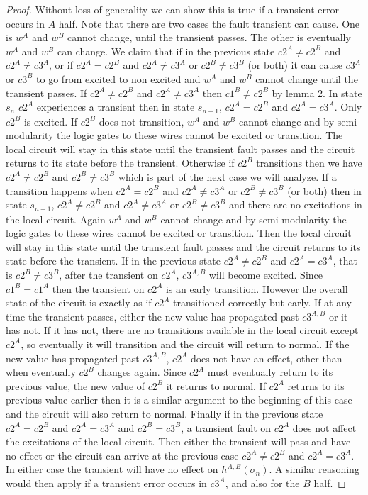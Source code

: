 \documentclass{article}
\begin{document}
\begin{proof}
Without loss of generality we can show this is true if a transient error occurs in $A$ half.  %
Note that there are two cases the fault transient can cause.  One is $w^A$ and $w^B$ cannot change, until the transient passes.  The other is eventually $w^A$ and $w^B$ can change. \newline
We claim that if in the previous state $c2^A \neq c2^B$ and $c2^A \neq c3^A$, or if $c2^A=c2^B$ and $c2^A\neq c3^A$ or $c2^B\neq c3^B$ (or both) it can cause $c3^A$ or $c3^B$ to go from excited to non excited and $w^A$ and $w^B$ cannot change until the transient passes.  If $c2^A \neq c2^B$ and $c2^A \neq c3^A$ then $c1^B\neq c2^B$ by lemma 2. In state $s_n$ $c2^A$ experiences a transient then in state $s_{n+1}$, $c2^A=c2^B$ and $c2^A=c3^A$.  Only $c2^B$ is excited.  If $c2^B$ does not transition, $w^A$ and $w^B$ cannot change and by semi-modularity the logic gates to these wires cannot be excited or transition. The local circuit will stay in this state until the transient fault passes and the circuit returns to its state before the transient.  Otherwise if $c2^B$ transitions then we have $c2^A\neq c2^B$ and $c2^B \neq c3^B$ which is part of the next case we will analyze.
If a transition happens when $c2^A=c2^B$ and $c2^A\neq c3^A$ or $c2^B\neq c3^B$ (or both) then in state $s_{n+1}$, $c2^A\neq c2^B$ and $c2^A\neq c3^A$ or $c2^B\neq c3^B$ and there are no excitations in the local circuit.  Again $w^A$ and $w^B$ cannot change and by semi-modularity the logic gates to these wires cannot be excited or transition.  Then the local circuit will stay in this state until the transient fault passes and the circuit returns to its state before the transient. \newline
If in the previous state $c2^A\neq c2^B$ and $c2^A= c3^A$, that is $c2^B\neq c3^B$, after the transient on $c2^A$, $c3^{A,B}$ will become excited.  Since $c1^B=c1^A$ then the transient on $c2^A$ is an early transition.  However the overall state of the circuit is exactly as if $c2^A$ transitioned correctly but early.  If at any time the transient passes, either the new value has propagated past $c3^{A,B}$ or it has not.  If it has not, there are no transitions available in the local circuit except $c2^A$, so eventually it will transition and the circuit will return to normal.  If the new value has propagated past $c3^{A,B}$, $c2^A$ does not have an effect, other than when eventually $c2^B$ changes again. Since $c2^A$ must eventually return to its previous value, the new value of $c2^B$ it returns to normal.  If $c2^A$ returns to its previous value earlier then it is a similar argument to the beginning of this case and the circuit will also return to normal.
Finally if in the previous state $c2^A=c2^B$ and $c2^A=c3^A$ and $c2^B=c3^B$, a transient fault on $c2^A$ does not affect the excitations of the local circuit.  Then either the transient will pass and have no effect or the circuit can arrive at the previous case $c2^A\neq c2^B$ and $c2^A= c3^A$.  In either case the transient will have no effect on $h^{A,B}(\sigma_n)$.
A similar reasoning would then apply if a transient error occurs in $c3^A$, and also for the $B$ half.  
\end{proof}
\end{document}
